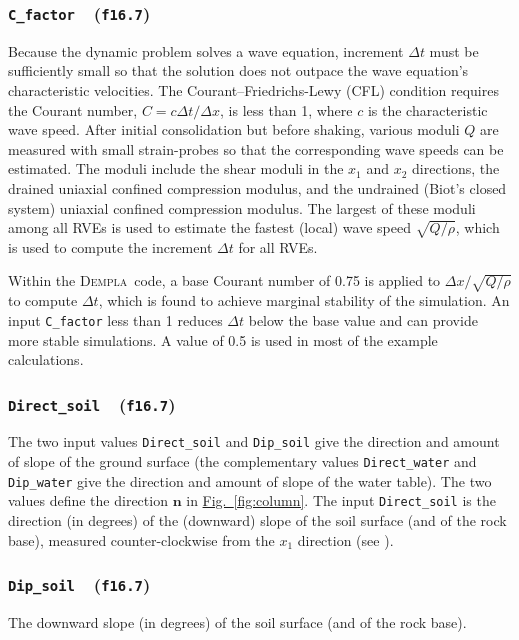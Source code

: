 \documentclass[letterpaper,11pt]{article}
\newcommand{\Dempla}{\textsc{Dempla}}
\newcommand{\Var}[2]{\texttt{#1}\ \  (\texttt{#2})}
\begin{document}
\subsubsection[\texttt{C\_factor}]{\Var{C\_factor}{f16.7}}\label{sec:Cfactor}
Because the dynamic problem solves a wave equation, 
increment $\Delta t$ must be sufficiently
small so that the solution does not outpace the wave equation's
characteristic velocities.
The Courant--Friedrichs-Lewy (CFL) condition requires
the Courant number, $C=c\Delta t/\Delta x$, is less than 1,
where $c$ is the characteristic wave speed.
After initial consolidation but before shaking,
various moduli $Q$ are measured with
small strain-probes so that the corresponding wave
speeds can be estimated.
The moduli include the shear moduli in the $x_{1}$ and $x_{2}$
directions, the drained uniaxial confined compression modulus,
and the undrained
(Biot's closed system)
uniaxial confined compression modulus.
The largest of these moduli among all RVEs
is used to estimate the fastest (local) wave speed $\sqrt{Q/\rho}$,
which is used to compute the increment $\Delta t$
for all RVEs.
\par
Within the \Dempla\ code, a base Courant number of 0.75
is applied to $\Delta x / \sqrt{Q/\rho}$ to compute $\Delta t$,
which is found to achieve marginal stability of the simulation.
An input \texttt{C\_factor} less than 1 reduces $\Delta t$ below
the base value
and can provide more stable simulations.
A value of 0.5 is used in most of the example calculations.
%
\subsubsection[\texttt{Direct\_soil}]{\Var{Direct\_soil}{f16.7}}
The two input values \texttt{Direct\_soil} and \texttt{Dip\_soil}
give the direction and amount of slope of the ground surface
(the complementary values
\texttt{Direct\_water} and \texttt{Dip\_water} give the
direction and amount of slope of the water table).
The two values define the direction $\mathbf{n}$ in
\hyperref[fig:column]{Fig.~\ref*{fig:column}}.
The input \texttt{Direct\_soil} is
the direction (in degrees) of the (downward) slope of the soil
surface (and of the rock base), measured coun\-ter-clock\-wise
from the $x_{1}$ direction (see \citep{Kuhn:2021a}).
%
\subsubsection[\texttt{Dip\_soil}]{\Var{Dip\_soil}{f16.7}}%
\label{sec:Dipsoil}
The downward slope (in degrees) of the soil surface
(and of the rock base).
%
\end{document}
